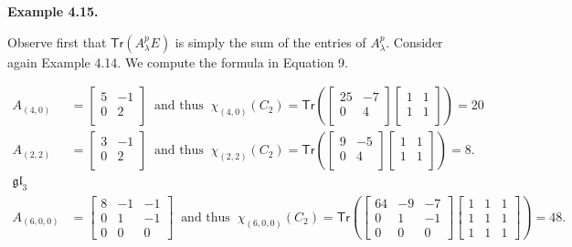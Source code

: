 \par\medskip\noindent\textbf{Example 4.15.}\par



Observe first that $\mathsf{Tr}(A_{\lambda}^{p}E)$ is simply the sum of the entries of $A_{\lambda}^{p}$.
Consider again Example 4.14. We compute the formula in Equation 9.



\[\begin{aligned}
\displaystyle A_{(4,0)} & \displaystyle=\left[\begin{smallmatrix}5&-1\\ 0&2\\ \end{smallmatrix}\right]\ \text{ and thus }\ \chi_{(4,0)}(C_{2})=\mathsf{Tr}\left(\left[\begin{smallmatrix}25&-7\\ 0&4\\ \end{smallmatrix}\right]\left[\begin{smallmatrix}1&1\\ 1&1\\ \end{smallmatrix}\right]\right)=20 \\
\displaystyle A_{(2,2)} & \displaystyle=\left[\begin{smallmatrix}3&-1\\ 0&2\\ \end{smallmatrix}\right]\ \text{ and thus }\ \chi_{(2,2)}(C_{2})=\mathsf{Tr}\left(\left[\begin{smallmatrix}9&-5\\ 0&4\\ \end{smallmatrix}\right]\left[\begin{smallmatrix}1&1\\ 1&1\\ \end{smallmatrix}\right]\right)=8. \\
\mathfrak{gl}_{3} \\
\displaystyle A_{(6,0,0)} & \displaystyle=\left[\begin{smallmatrix}8&-1&-1\\ 0&1&-1\\ 0&0&0\end{smallmatrix}\right]\ \text{ and thus }\ \chi_{(6,0,0)}(C_{2})=\mathsf{Tr}\left(\left[\begin{smallmatrix}64&-9&-7\\ 0&1&-1\\ 0&0&0\end{smallmatrix}\right]\left[\begin{smallmatrix}1&1&1\\ 1&1&1\\ 1&1&1\end{smallmatrix}\right]\right)=48.\ 
\end{aligned}\]






